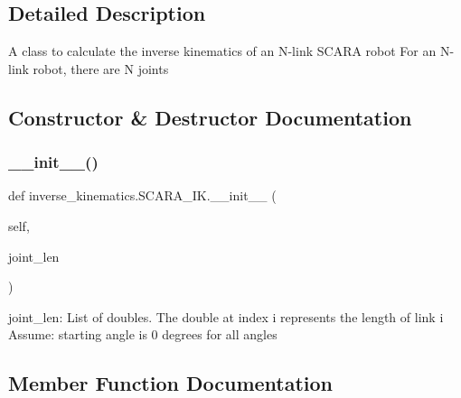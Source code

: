 \subsection{Detailed Description}
\begin{DoxyVerb}A class to calculate the inverse kinematics of an N-link SCARA robot
For an N-link robot, there are N joints
\end{DoxyVerb}
 

\subsection{Constructor \& Destructor Documentation}
\mbox{\label{classinverse__kinematics_1_1_s_c_a_r_a___i_k_a68c331184cb5d0b9bc28567922cedd01}} 
\subsubsection{\texorpdfstring{\+\_\+\+\_\+init\+\_\+\+\_\+()}{\_\_init\_\_()}}
{\footnotesize\ttfamily def inverse\+\_\+kinematics.\+S\+C\+A\+R\+A\+\_\+\+I\+K.\+\_\+\+\_\+init\+\_\+\+\_\+ (\begin{DoxyParamCaption}\item[{}]{self,  }\item[{}]{joint\+\_\+len }\end{DoxyParamCaption})}

\begin{DoxyVerb}joint_len: List of doubles. The double at index i represents the length of link i
Assume: starting angle is 0 degrees for all angles
\end{DoxyVerb}
 

\subsection{Member Function Documentation}
\mbox{\label{classinverse__kinematics_1_1_s_c_a_r_a___i_k_ac5dd573c899961b0b402ecab76c34499}} 
